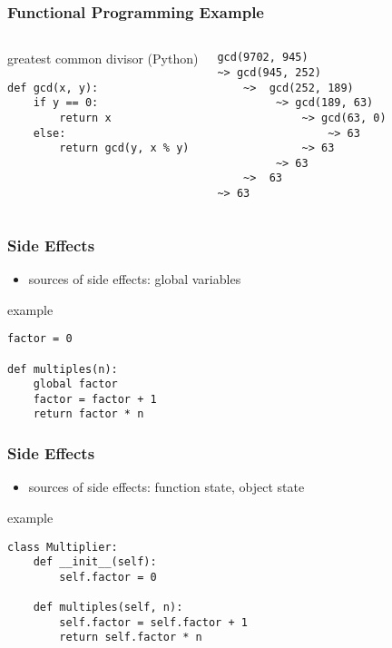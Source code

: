 \documentclass[dvipsnames]{beamer}
\theoremstyle{plain}
\begin{document}
\begin{frame}[fragile]
  \frametitle{Functional Programming Example}

  \begin{columns}
    \begin{exampleblock}{greatest common divisor (Python)}
      \begin{lstlisting}
def gcd(x, y):
    if y == 0:
        return x
    else:
        return gcd(y, x % y)
      \end{lstlisting}
    \end{exampleblock}

    \lstinline{gcd(9702, 945)}\\
    \lstinline{~> gcd(945, 252)}\\
    \lstinline{    ~>  gcd(252, 189)}\\
    \lstinline{         ~> gcd(189, 63)}\\
    \lstinline{             ~> gcd(63, 0)}\\
    \lstinline{                 ~> 63}\\
    \lstinline{             ~> 63}\\
    \lstinline{         ~> 63}\\
    \lstinline{    ~>  63}\\
    \lstinline{~> 63}
  \end{columns}
\end{frame}

\begin{frame}[fragile]
  \frametitle{Side Effects}

  \begin{itemize}
    \item sources of side effects: global variables
  \end{itemize}

  \begin{exampleblock}{example}
    \begin{lstlisting}
factor = 0

def multiples(n):
    global factor
    factor = factor + 1
    return factor * n
    \end{lstlisting}
  \end{exampleblock}
\end{frame}

\begin{frame}[fragile]
  \frametitle{Side Effects}

  \begin{itemize}
    \item sources of side effects: function state, object state
  \end{itemize}

  \begin{exampleblock}{example}
    \begin{lstlisting}
class Multiplier:
    def __init__(self):
        self.factor = 0

    def multiples(self, n):
        self.factor = self.factor + 1
        return self.factor * n
    \end{lstlisting}
  \end{exampleblock}
\end{frame}
\end{document}
